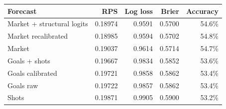 \small
\begin{tabular}{lrrrr}
\toprule
Forecast & RPS & Log loss & Brier & Accuracy \\
\midrule
Market + structural logits & 0.18974 & 0.9591 & 0.5700 & 54.6\% \\
Market recalibrated & 0.18985 & 0.9594 & 0.5702 & 54.8\% \\
Market & 0.19037 & 0.9614 & 0.5714 & 54.7\% \\
Goals + shots & 0.19667 & 0.9834 & 0.5852 & 53.6\% \\
Goals calibrated & 0.19721 & 0.9858 & 0.5862 & 53.4\% \\
Goals raw & 0.19722 & 0.9857 & 0.5862 & 53.4\% \\
Shots & 0.19871 & 0.9905 & 0.5900 & 53.2\% \\
\bottomrule
\end{tabular}
